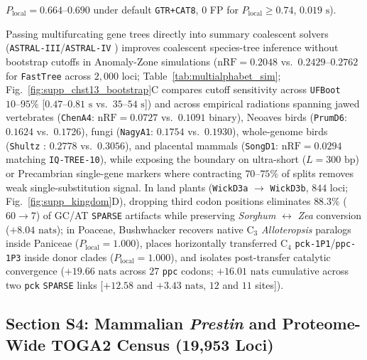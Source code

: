 \documentclass[12pt]{article}
\begin{document}
$P_{\text{local}} = 0.664\text{--}0.690$ under default \texttt{GTR+CAT8}, $0$ FP for $P_{\text{local}} \ge 0.74$, $0.019\text{ s}$).

Passing multifurcating gene trees directly into summary coalescent solvers (\texttt{ASTRAL-III}/\texttt{ASTRAL-IV} \cite{zhang2018astral,zhang2025aster}) improves coalescent species-tree inference without bootstrap cutoffs in Anomaly-Zone simulations ($\text{nRF} = 0.2048$ vs.\ $0.2429\text{--}0.2762$ for \texttt{FastTree} across $2,000$ loci; Table~\ref{tab:multialphabet_sim}; Fig.~\ref{fig:supp_chst13_bootstrap}C compares cutoff sensitivity across \texttt{UFBoot} $10\text{--}95\%$ [$0.47\text{--}0.81\text{ s}$ vs.\ $35\text{--}54\text{ s}$]) and across empirical radiations spanning jawed vertebrates (\texttt{ChenA4}: $\text{nRF} = 0.0727$ vs.\ $0.1091$ binary), Neoaves birds (\texttt{PrumD6}: $0.1624$ vs.\ $0.1726$), fungi (\texttt{NagyA1}: $0.1754$ vs.\ $0.1930$), whole-genome birds (\texttt{Shultz} \cite{shultz2019widespread}: $0.2778$ vs.\ $0.3056$), and placental mammals (\texttt{SongD1}: $\text{nRF} = 0.0294$ matching \texttt{IQ-TREE-10}), while exposing the boundary on ultra-short ($L=300\text{ bp}$) or Precambrian single-gene markers where contracting $70\text{--}75\%$ of splits removes weak single-substitution signal. In land plants (\texttt{WickD3a} $\to$ \texttt{WickD3b}, $844$ loci; Fig.~\ref{fig:supp_kingdom}D), dropping third codon positions eliminates $88.3\%$ ($60 \to 7$) of GC/AT \texttt{SPARSE} artifacts while preserving \textit{Sorghum} $\leftrightarrow$ \textit{Zea} conversion ($+8.04\text{ nats}$); in Poaceae, Bushwhacker recovers native $\text{C}_3$ \textit{Alloteropsis} paralogs inside Paniceae ($P_{\text{local}}=1.000$), places horizontally transferred $\text{C}_4$ \texttt{pck-1P1}/\texttt{ppc-1P3} inside donor clades ($P_{\text{local}}=1.000$), and isolates post-transfer catalytic convergence ($+19.66\text{ nats}$ across $27$ \texttt{ppc} codons; $+16.01\text{ nats}$ cumulative across two \texttt{pck} \texttt{SPARSE} links [$+12.58$ and $+3.43\text{ nats}$, $12$ and $11$ sites]).

\subsection*{Section S4: Mammalian \textit{Prestin} and Proteome-Wide TOGA2 Census (19,953 Loci)}
\end{document}
